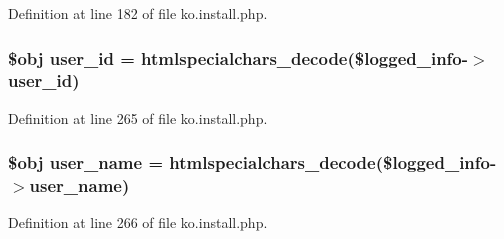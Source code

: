 Definition at line 182 of file ko.\+install.\+php.

\hypertarget{ko_8install_8php_a74f1a394389d774e5b4cd5d1d15413f7}{}
\subsubsection[{user\+\_\+id}]{\setlength{\rightskip}{0pt plus 5cm}\$obj user\+\_\+id = htmlspecialchars\+\_\+decode(\$logged\+\_\+info-\/$>$user\+\_\+id)}\label{ko_8install_8php_a74f1a394389d774e5b4cd5d1d15413f7}


Definition at line 265 of file ko.\+install.\+php.

\hypertarget{ko_8install_8php_a115401aff7da80e73c66e9f76505426b}{}
\subsubsection[{user\+\_\+name}]{\setlength{\rightskip}{0pt plus 5cm}\$obj user\+\_\+name = htmlspecialchars\+\_\+decode(\$logged\+\_\+info-\/$>$user\+\_\+name)}\label{ko_8install_8php_a115401aff7da80e73c66e9f76505426b}


Definition at line 266 of file ko.\+install.\+php.

